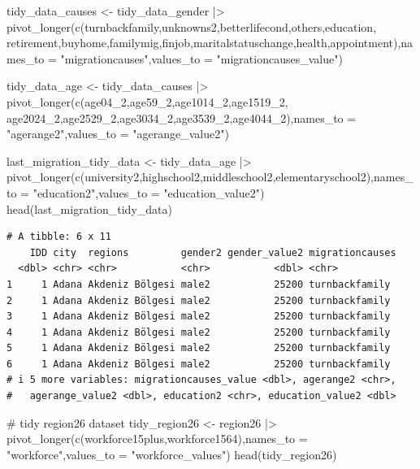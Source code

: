 \documentclass[
  11pt,
  a4paper,
  DIV=11,
  numbers=noendperiod]{scrartcl}
\newenvironment{Shaded}{\begin{snugshade}}{\end{snugshade}}
\newcommand{\AttributeTok}[1]{\textcolor[rgb]{0.40,0.45,0.13}{#1}}
\newcommand{\CommentTok}[1]{\textcolor[rgb]{0.37,0.37,0.37}{#1}}
\newcommand{\FunctionTok}[1]{\textcolor[rgb]{0.28,0.35,0.67}{#1}}
\newcommand{\NormalTok}[1]{\textcolor[rgb]{0.00,0.23,0.31}{#1}}
\newcommand{\OtherTok}[1]{\textcolor[rgb]{0.00,0.23,0.31}{#1}}
\newcommand{\SpecialCharTok}[1]{\textcolor[rgb]{0.37,0.37,0.37}{#1}}
\newcommand{\StringTok}[1]{\textcolor[rgb]{0.13,0.47,0.30}{#1}}
\begin{document}
\begin{Shaded}
\begin{Highlighting}[]
\NormalTok{tidy\_data\_causes }\OtherTok{\textless{}{-}}\NormalTok{ tidy\_data\_gender }\SpecialCharTok{|\textgreater{}} \FunctionTok{pivot\_longer}\NormalTok{(}\FunctionTok{c}\NormalTok{(turnbackfamily,unknowns2,betterlifecond,others,education,}
\NormalTok{                                                retirement,buyhome,familymig,finjob,maritalstatuschange,health,appointment),}\AttributeTok{names\_to =} \StringTok{"migrationcauses"}\NormalTok{,}\AttributeTok{values\_to =} \StringTok{"migrationcauses\_value"}\NormalTok{)}

\NormalTok{tidy\_data\_age }\OtherTok{\textless{}{-}}\NormalTok{ tidy\_data\_causes }\SpecialCharTok{|\textgreater{}} \FunctionTok{pivot\_longer}\NormalTok{(}\FunctionTok{c}\NormalTok{(age04\_2,age59\_2,age1014\_2,age1519\_2,}
\NormalTok{                                                    age2024\_2,age2529\_2,age3034\_2,age3539\_2,age4044\_2),}\AttributeTok{names\_to =} \StringTok{"agerange2"}\NormalTok{,}\AttributeTok{values\_to =} \StringTok{"agerange\_value2"}\NormalTok{)}

\NormalTok{last\_migration\_tidy\_data }\OtherTok{\textless{}{-}}\NormalTok{ tidy\_data\_age }\SpecialCharTok{|\textgreater{}} \FunctionTok{pivot\_longer}\NormalTok{(}\FunctionTok{c}\NormalTok{(university2,highschool2,middleschool2,elementaryschool2),}\AttributeTok{names\_to =} \StringTok{"education2"}\NormalTok{,}\AttributeTok{values\_to =} \StringTok{"education\_value2"}\NormalTok{)}
\FunctionTok{head}\NormalTok{(last\_migration\_tidy\_data)}
\end{Highlighting}
\end{Shaded}

\begin{verbatim}
# A tibble: 6 x 11
    IDD city  regions         gender2 gender_value2 migrationcauses
  <dbl> <chr> <chr>           <chr>           <dbl> <chr>          
1     1 Adana Akdeniz Bölgesi male2           25200 turnbackfamily 
2     1 Adana Akdeniz Bölgesi male2           25200 turnbackfamily 
3     1 Adana Akdeniz Bölgesi male2           25200 turnbackfamily 
4     1 Adana Akdeniz Bölgesi male2           25200 turnbackfamily 
5     1 Adana Akdeniz Bölgesi male2           25200 turnbackfamily 
6     1 Adana Akdeniz Bölgesi male2           25200 turnbackfamily 
# i 5 more variables: migrationcauses_value <dbl>, agerange2 <chr>,
#   agerange_value2 <dbl>, education2 <chr>, education_value2 <dbl>
\end{verbatim}

\begin{Shaded}
\begin{Highlighting}[]
\CommentTok{\# tidy region26 dataset}
\NormalTok{tidy\_region26 }\OtherTok{\textless{}{-}}\NormalTok{ region26 }\SpecialCharTok{|\textgreater{}} \FunctionTok{pivot\_longer}\NormalTok{(}\FunctionTok{c}\NormalTok{(workforce15plus,workforce1564),}\AttributeTok{names\_to =} \StringTok{"workforce"}\NormalTok{,}\AttributeTok{values\_to =} \StringTok{"workforce\_values"}\NormalTok{)}
\FunctionTok{head}\NormalTok{(tidy\_region26)}
\end{Highlighting}
\end{Shaded}
\end{document}
